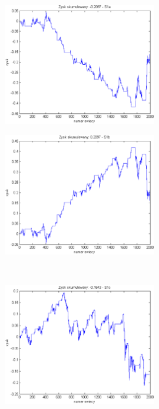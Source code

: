 \documentclass{tewiart}
\begin{document}
\FloatBarrier
\begin{figure}[h]
\centering
\begin{minipage}{\linewidth}
\centering
\includegraphics[width=0.6\textwidth]{images/fcopperS1a.eps}
\label{jedno}
\end{minipage}
\begin{minipage}{\linewidth}
\centering
\includegraphics[width=0.6\textwidth]{images/fcopperS1b.eps}
\label{dwu}
\end{minipage}
\\
\begin{minipage}{\linewidth}
\centering
\includegraphics[width=0.6\textwidth]{images/fcopperS1c.eps}

\end{minipage}
\end{figure}
\end{document}
